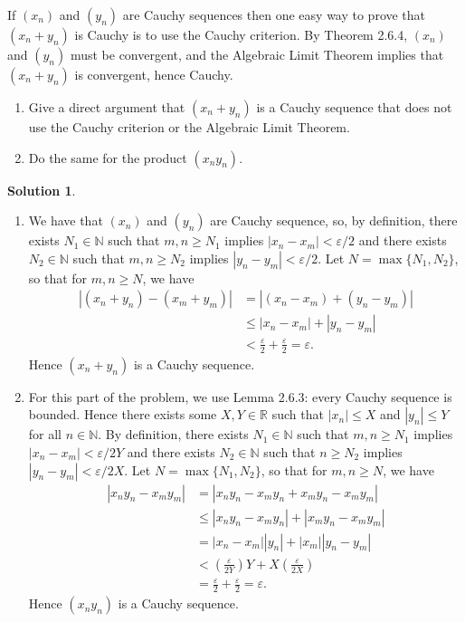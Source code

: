 \documentclass[12pt]{article}
\theoremstyle{definition}
\theoremstyle{definition}
\newtheorem*{soln}{Solution}
\newcommand{\N}{\mathbb{N}}
\newcommand{\R}{\mathbb{R}}
\begin{document}
\break

\begin{prob}
If $(x_n)$ and $(y_n)$ are Cauchy sequences then one easy way to prove that $(x_n+y_n)$ is Cauchy is to use the Cauchy criterion. By Theorem 2.6.4, $(x_n)$ and $(y_n)$ must be convergent, and the Algebraic Limit Theorem implies that $(x_n+y_n)$ is convergent, hence Cauchy.
\begin{enumerate}[label=(\alph*)]
\item Give a direct argument that $(x_n+y_n)$ is a Cauchy sequence that does not use the Cauchy criterion or the Algebraic Limit Theorem.

\item Do the same for the product $(x_ny_n)$.
\end{enumerate}
\end{prob}



\begin{soln}
\begin{enumerate}[label=(\alph*)]
\item We have that $(x_n)$ and $(y_n)$ are Cauchy sequence, so, by definition, there exists $N_1\in \N$ such that $m,n\geq N_1$ implies $|x_n-x_m|<\varepsilon/2$ and there exists $N_2\in\N$ such that $m,n\geq N_2$ implies $|y_n-y_m|<\varepsilon/2$. Let $N=\max\{N_1,N_2\}$, so that for $m,n\geq N$, we have
\begin{align*}
|(x_n+y_n)-(x_m+y_m)| &= |(x_n-x_m)+(y_n-y_m)|\\
&\leq |x_n-x_m|+|y_n-y_m| \tag{by the triangle inequality}\\
&<\frac{\varepsilon}{2}+\frac{\varepsilon}{2}=\varepsilon.
\end{align*}
Hence $(x_n+y_n)$ is a Cauchy sequence.

\item For this part of the problem, we use Lemma 2.6.3: every Cauchy sequence is bounded. Hence there exists some $X,Y\in \R$ such that $|x_n|\leq X$ and $|y_n|\leq Y$ for all $n\in\N$. By definition, there exists $N_1\in\N$ such that $m,n\geq N_1$ implies $|x_n-x_m|<\varepsilon/2Y$ and there exists $N_2\in\N$ such that $n\geq N_2$ implies $|y_n-y_m|<\varepsilon/2X$. Let $N=\max\{N_1,N_2\}$, so that for $m,n\geq N$, we have
\begin{align*}
|x_ny_n-x_my_m| &= |x_ny_n-x_my_n+x_my_n-x_my_m|\\
&\leq |x_ny_n-x_my_n|+|x_my_n-x_my_m| \tag{by the triangle inequality}\\
&= |x_n-x_m| |y_n| + |x_m| |y_n-y_m| \\
&< \left(\frac{\varepsilon}{2Y}\right)Y + X\left(\frac{\varepsilon}{2X}\right)\\
&= \frac{\varepsilon}{2}+\frac{\varepsilon}{2}=\varepsilon.
\end{align*}
Hence $(x_ny_n)$ is a Cauchy sequence.
\end{enumerate}
\end{soln}
\end{document}
